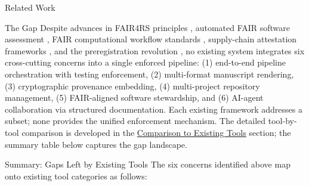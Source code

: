 \documentclass[
  ignorenonframetext,
]{beamer}
\newcounter{none} %
\begin{document}
\begin{frame}{Related Work}
\begin{block}{The Gap}
\protect{}\label{the-gap}
Despite advances in FAIR4RS principles , automated FAIR software assessment
, FAIR computational workflow standards
, supply-chain attestation frameworks
, and the preregistration
revolution , no existing system
integrates six cross-cutting concerns into a single enforced pipeline:
(1) end-to-end pipeline orchestration with testing enforcement, (2)
multi-format manuscript rendering, (3) cryptographic provenance
embedding, (4) multi-project repository management, (5) FAIR-aligned
software stewardship, and (6) AI-agent collaboration via structured
documentation. Each existing framework addresses a subset; none provides
the unified enforcement mechanism. The detailed tool-by-tool comparison
is developed in the
\href{05c_comparison.md\#comparison-to-existing-tools}{Comparison to
Existing Tools} section; the summary table below captures the gap
landscape.
\end{block}

\begin{block}{Summary: Gaps Left by Existing Tools}
\protect{}\label{summary-gaps-left-by-existing-tools}
The six concerns identified above map onto existing tool categories as
follows:


\end{block}
\end{frame}
\end{document}
